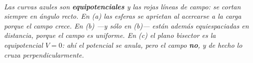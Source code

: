 \begin{center}
\begin{tikzpicture}[scale=1]
\end{tikzpicture}\\[0.5em]
{\small\itshape Las curvas azules son \textbf{equipotenciales} y las rojas
líneas de campo: se cortan siempre en ángulo recto. En (a) las esferas se
aprietan al acercarse a la carga porque el campo crece. En (b) ---y sólo en
(b)--- están además equiespaciadas en distancia, porque el campo es uniforme. En
(c) el plano bisector es la equipotencial $V=0$: ahí el potencial se anula, pero
el campo \textbf{no}, y de hecho lo cruza perpendicularmente.}
\end{center}
